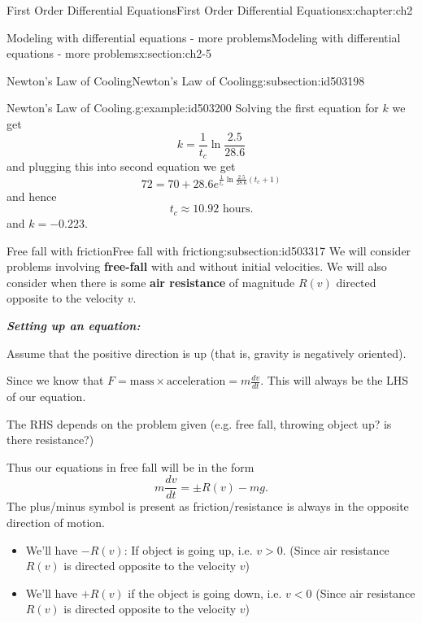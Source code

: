 \documentclass[oneside,10pt,]{book}
\newcommand{\alert}[1]{\textbf{\textit{#1}}}
\newcommand{\terminology}[1]{\textbf{#1}}
\numberwithin{equation}{section}
\numberwithin{equation}{section}
\newcommand{\lt}{<}
\begin{document}
\begin{chapterptx}{First Order Differential Equations}{}{First Order Differential Equations}{}{}{x:chapter:ch2}
\begin{sectionptx}{Modeling with differential equations - more problems}{}{Modeling with differential equations - more problems}{}{}{x:section:ch2-5}
\begin{subsectionptx}{Newton's Law of Cooling}{}{Newton's Law of Cooling}{}{}{g:subsection:id503198}
\begin{example}{Newton's Law of Cooling.}{g:example:id503200}
Solving the first equation for \(k\) we get%
\begin{equation*}
k=\frac{1}{t_{c}}\ln\frac{2.5}{28.6}
\end{equation*}
and plugging this into second equation we get%
\begin{equation*}
72=70+28.6e^{\frac{1}{t_{c}}\ln\frac{2.5}{28.6}(t_{c}+1)}
\end{equation*}
and hence%
\begin{equation*}
t_{c}\approx10.92\text{ hours}.
\end{equation*}
and \(k=-0.223\).%
\end{example}
\end{subsectionptx}
%
%
\typeout{************************************************}
\typeout{************************************************}
%
\begin{subsectionptx}{Free fall with friction}{}{Free fall with friction}{}{}{g:subsection:id503317}
We will consider problems involving \terminology{free-fall} with and without initial velocities. We will also consider when there is some \terminology{air resistance} of magnitude \(R(v)\) directed opposite to the velocity \(v\).%
\par
\alert{Setting up an equation:}%
\par
Assume that the positive direction is up (that is, gravity is negatively oriented).%
\par
Since we know that \(F=\text{mass}\times\text{acceleration}=m\frac{dv}{dt}\). This will always be the LHS of our equation.%
\par
The RHS depends on the problem given (e.g. free fall, throwing object up? is there resistance?)%
\par
Thus our equations in free fall will be in the form%
\begin{equation*}
m\frac{dv}{dt}=\pm R(v) - mg.
\end{equation*}
The plus\slash{}minus symbol is present as friction\slash{}resistance is always in the opposite direction of motion.%
%
\begin{itemize}[label=\textbullet]
\item{}We'll have \(-R(v)\): If object is going up, i.e. \(v>0\). (Since air resistance \(R(v)\) is directed opposite to the velocity \(v\))%
\item{}We'll have \(+R(v)\) if the object is going down, i.e. \(v\lt0\) (Since air resistance \(R(v)\) is directed opposite to the velocity \(v\))%
\end{itemize}

\end{subsectionptx}
\end{sectionptx}
\end{chapterptx}
\end{document}
